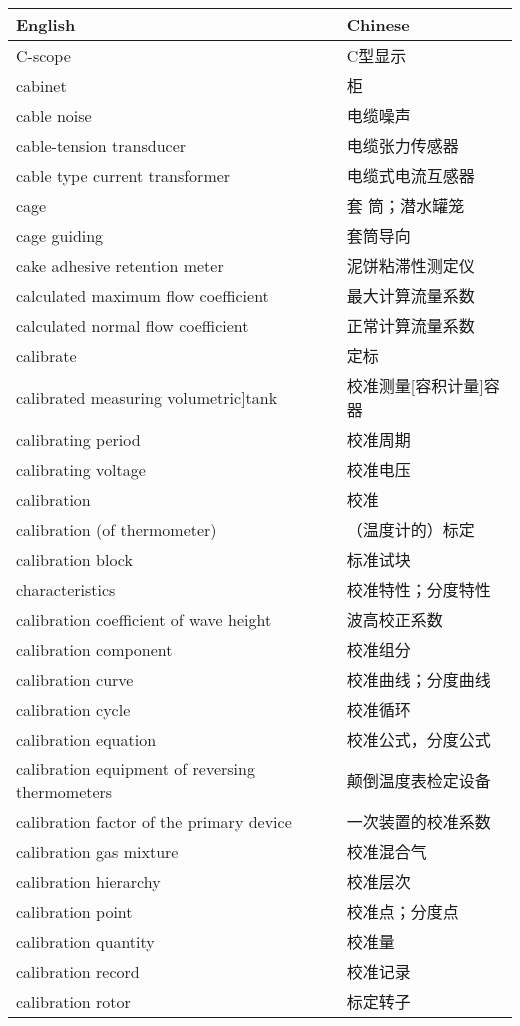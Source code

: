 \documentclass[
]{article}
\begin{document}
\begin{longtable}[]{@{}ll@{}}
\toprule()
English & Chinese \\
\midrule()
\endhead
C-scope & C型显示 \\
cabinet & 柜 \\
cable noise & 电缆噪声 \\
cable-tension transducer & 电缆张力传感器 \\
cable type current transformer & 电缆式电流互感器 \\
cage & 套 筒；潜水罐笼 \\
cage guiding & 套筒导向 \\
cake adhesive retention meter & 泥饼粘滞性测定仪 \\
calculated maximum flow coefficient & 最大计算流量系数 \\
calculated normal flow coefficient & 正常计算流量系数 \\
calibrate & 定标 \\
calibrated measuring volumetric{]}tank & 校准测量{[}容积计量{]}容器 \\
calibrating period & 校准周期 \\
calibrating voltage & 校准电压 \\
calibration & 校准 \\
calibration (of thermometer) & （温度计的）标定 \\
calibration block & 标准试块 \\
characteristics & 校准特性；分度特性 \\
calibration coefficient of wave height & 波高校正系数 \\
calibration component & 校准组分 \\
calibration curve & 校准曲线；分度曲线 \\
calibration cycle & 校准循环 \\
calibration equation & 校准公式，分度公式 \\
calibration equipment of reversing thermometers & 颠倒温度表检定设备 \\
calibration factor of the primary device & 一次装置的校准系数 \\
calibration gas mixture & 校准混合气 \\
calibration hierarchy & 校准层次 \\
calibration point & 校准点；分度点 \\
calibration quantity & 校准量 \\
calibration record & 校准记录 \\
calibration rotor & 标定转子 \\

\end{longtable}
\end{document}
